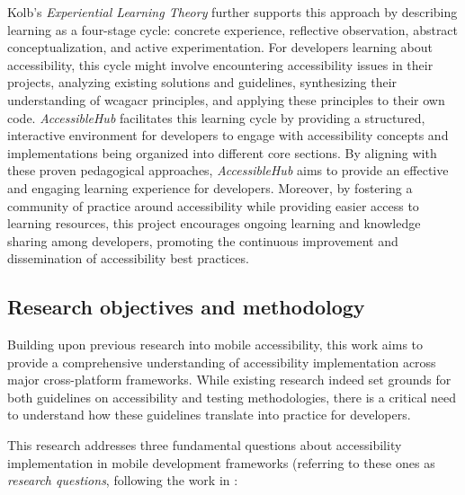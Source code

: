 Kolb's \textit{Experiential Learning Theory} \cite{kolb1984experiential} further supports this approach by describing learning as a four-stage cycle: concrete experience, reflective observation, abstract conceptualization, and active experimentation. For developers learning about accessibility, this cycle might involve encountering accessibility issues in their projects, analyzing existing solutions and guidelines, synthesizing their understanding of \acrshort{wcagacr} principles, and applying these principles to their own code. \textit{AccessibleHub} facilitates this learning cycle by providing a structured, interactive environment for developers to engage with accessibility concepts and implementations being organized into different core sections. By aligning with these proven pedagogical approaches, \textit{AccessibleHub} aims to provide an effective and engaging learning experience for developers. Moreover, by fostering a community of practice around accessibility while providing easier access to learning resources, this project encourages ongoing learning and knowledge sharing among developers, promoting the continuous improvement and dissemination of accessibility best practices.

\subsection{Research objectives and methodology}

Building upon previous research into mobile accessibility, this work aims to provide a comprehensive understanding of accessibility implementation across major cross-platform frameworks. While existing research indeed set grounds for both guidelines on accessibility and testing methodologies, there is a critical need to understand how these guidelines translate into practice for developers. 

This research addresses three fundamental questions about accessibility implementation in mobile development frameworks (referring to these ones as \textit{research questions}, following the work in \cite{perinello2024accessibility}:

